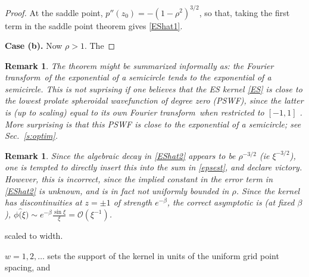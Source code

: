 \documentclass[10pt]{article}
\newcommand{\bigO}{{\mathcal O}}
\newtheorem{rmk}[thm]{Remark}
\newcommand{\freq}{\beta}          %
\newcommand{\FT}{Fourier transform}
\begin{document}
\begin{proof}
At the saddle point, $p''(z_0) = -(1-\rho^2)^{3/2}$,
so that, taking the first term in the saddle point theorem
\cite[Thm.~7.1, p.~127]{olver}
gives \eqref{EShat1}.

{\bf Case (b).}
Now $\rho>1$. The 




\end{proof}

\begin{rmk}
  The theorem might be summarized informally as:
  {\em the \FT\ of the exponential
    of a semicircle tends to the exponential of a semicircle}.
  This is not suprising
  if one believes that the ES kernel \eqref{ES} is close
  to the lowest prolate spheroidal wavefunction of degree zero (PSWF),
  since the latter is (up to scaling)
  equal to its own \FT\ when restricted to $[-1,1]$ \cite{osipov}.
  More surprising is that this PSWF is close to the exponential
  of a semicircle; see Sec.~\ref{s:optim}.
%
\end{rmk}  

\begin{rmk}
Since the algebraic decay in \eqref{EShat2} appears to be
$\rho^{-3/2}$ (ie $\xi^{-3/2}$), one is tempted to
directly insert this into the sum in \eqref{epsest},
and declare victory.
However, this is incorrect, since the implied constant in the error
term in \eqref{EShat2} is unknown, and is in fact not uniformly bounded
in $\rho$.
Since the kernel has discontinuities at $z=\pm 1$ of strength $e^{-\freq}$,
the correct asymptotic is (at fixed $\freq$),
$\phi\hat(\xi) \sim e^{-\freq} \frac{\sin \xi}{\xi} = \bigO(\xi^{-1})$.

\label{r:decay}
\end{rmk}







scaled to width.

$w=1,2,\ldots$
sets the support of the kernel in units of the uniform grid point spacing, and
\end{document}
